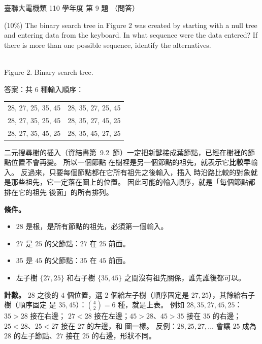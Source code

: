 \begin{pastexam}[label={px:ust-110-ee-ds-09}]{臺聯大電機類 110 學年度 第 9 題}
（問答）

(10\%) The binary search tree in Figure 2 was created by starting with a null tree and entering data from
the keyboard. In what sequence were the data entered? If there is more than one possible sequence,
identify the alternatives.

\begin{center}
\\[2pt] Figure 2. Binary search tree.\end{center}
\end{pastexam}

\begin{pastsoln}
答案：共 $6$ 種輸入順序：
\begin{center}
\begin{tabular}{ll}
28, 27, 25, 35, 45 & 28, 35, 27, 25, 45 \\
28, 27, 35, 25, 45 & 28, 35, 27, 45, 25 \\
28, 27, 35, 45, 25 & 28, 35, 45, 27, 25
\end{tabular}
\end{center}

二元搜尋樹的插入（資結書第~9.2~節）一定把新鍵接成葉節點，已經在樹裡的節點位置不會再變。 所以一個節點
在樹裡是另一個節點的祖先，就表示它\textbf{比較早}輸入。 反過來，只要每個節點都在它所有祖先之後輸入，插入
時沿路比較的對象就是那些祖先，它一定落在圖上的位置。 因此可能的輸入順序，就是「每個節點都排在它的祖先
後面」的所有排列。

\textbf{條件。}
\begin{itemize}
\item $28$ 是根，是所有節點的祖先，必須第一個輸入。
\item $27$ 是 $25$ 的父節點：$27$ 在 $25$ 前面。
\item $35$ 是 $45$ 的父節點：$35$ 在 $45$ 前面。
\item 左子樹 $\{27, 25\}$ 和右子樹 $\{35, 45\}$ 之間沒有祖先關係，誰先誰後都可以。
\end{itemize}

\textbf{計數。} $28$ 之後的 $4$ 個位置，選 $2$ 個給左子樹（順序固定是 $27, 25$），其餘給右子樹（順序固定
是 $35, 45$）：$\binom{4}{2} = 6$ 種，就是上表。 例如 $28, 35, 27, 45, 25$：$35 > 28$ 接在右邊；
$27 < 28$ 接在左邊；$45 > 28$、$45 > 35$ 接在 $35$ 的右邊；$25 < 28$、$25 < 27$ 接在 $27$ 的左邊，和
圖一樣。 反例：$28, 25, 27, \ldots$ 會讓 $25$ 成為 $28$ 的左子節點、$27$ 接在 $25$ 的右邊，形狀不同。
\end{pastsoln}
